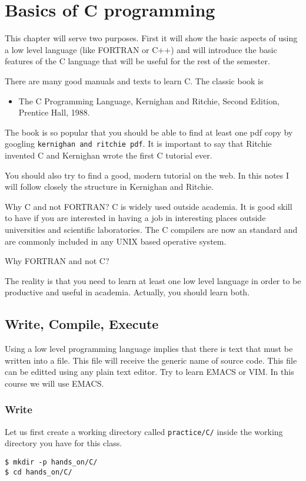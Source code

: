 \documentclass{article}
\begin{document}
\section[2]{Basics of C programming}
This chapter will serve two purposes. First it will show the basic aspects of using a low level language (like FORTRAN or C++) and will introduce the basic features of the C language that will be useful for the rest of the semester.

There are many good manuals and texts to learn C. The classic book is 
\begin{itemize}
\item The C Programming Language, Kernighan and Ritchie, Second Edition, Prentice Hall, 1988.
\end{itemize}

The book is so popular that you should be able to find at least one pdf copy by googling \verb"kernighan and ritchie pdf". It is important to say that Ritchie invented C and Kernighan wrote the first C tutorial ever.

You should also try to find a good, modern tutorial on the web. In this notes I will follow closely the structure in Kernighan and Ritchie.

Why C and not FORTRAN?
C is widely used outside academia. It is good skill to have if you are interested in having a job in interesting places outside universities and scientific laboratories. 
The C compilers are now an standard and are commonly included in any UNIX based operative system.

Why FORTRAN and not C?

The reality is that you need to learn at least one low level language in order to be productive and useful in academia. Actually, you should learn both.


\subsection{Write, Compile, Execute}
Using a low level programming language implies that there is text that must be written into a file. This file will receive the generic name of source code. This file can be editted using any plain text editor. Try to learn EMACS or VIM. In this course we will use EMACS.

\subsubsection{Write}
Let us first create a working directory called \verb"practice/C/" inside the working directory you have for this class.
\begin{verbatim}
$ mkdir -p hands_on/C/
$ cd hands_on/C/
\end{verbatim}
\end{document}
